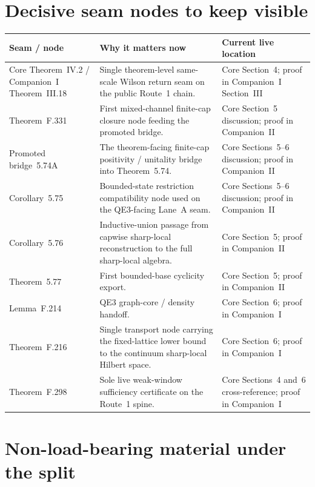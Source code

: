 \documentclass[11pt]{article}
\begin{document}
\section{Decisive seam nodes to keep visible}

\begin{center}
\small
\begin{tabularx}{\linewidth}{@{}L{3.1cm}Y Y@{}}
\toprule
\textbf{Seam / node} & \textbf{Why it matters now} & \textbf{Current live location}\\
\midrule
Core Theorem~IV.2 / Companion~I Theorem~III.18 & Single theorem-level same-scale Wilson return seam on the public Route~1 chain. & Core Section~4; proof in Companion~I Section~III\\
Theorem~F.331 & First mixed-channel finite-cap closure node feeding the promoted bridge. & Core Section~5 discussion; proof in Companion~II\\
Promoted bridge~5.74A & The theorem-facing finite-cap positivity / unitality bridge into Theorem~5.74. & Core Sections~5--6 discussion; proof in Companion~II\\
Corollary~5.75 & Bounded-state restriction compatibility node used on the QE3-facing Lane~A seam. & Core Sections~5--6 discussion; proof in Companion~II\\
Corollary~5.76 & Inductive-union passage from capwise sharp-local reconstruction to the full sharp-local algebra. & Core Section~5; proof in Companion~II\\
Theorem~5.77 & First bounded-base cyclicity export. & Core Section~5; proof in Companion~II\\
Lemma~F.214 & QE3 graph-core / density handoff. & Core Section~6; proof in Companion~I\\
Theorem~F.216 & Single transport node carrying the fixed-lattice lower bound to the continuum sharp-local Hilbert space. & Core Section~6; proof in Companion~I\\
Theorem~F.298 & Sole live weak-window sufficiency certificate on the Route~1 spine. & Core Sections~4 and~6 cross-reference; proof in Companion~I\\
\bottomrule
\end{tabularx}
\end{center}

\section{Non-load-bearing material under the split}
\end{document}
